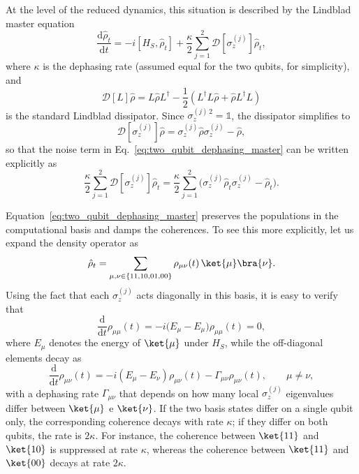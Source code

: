 At the level of the reduced dynamics, this situation is described by the Lindblad master equation
\begin{equation}
	\frac{\mathrm{d}\hat{\rho}_t}{\mathrm{d}t}
	= - i [H_S, \hat{\rho}_t]
	+ \frac{\kappa}{2}\sum_{j=1}^{2} \mathcal{D}[\sigma_z^{(j)}]\hat{\rho}_t,
	\label{eq:two_qubit_dephasing_master}
\end{equation}
where $\kappa$ is the dephasing rate (assumed equal for the two qubits, for simplicity), and
\begin{equation}
	\mathcal{D}[L]\hat{\rho} = L \hat{\rho} L^{\dagger}
	- \frac{1}{2}\left( L^{\dagger} L \hat{\rho} + \hat{\rho} L^{\dagger} L \right)
	\label{eq:dissipator_definition}
\end{equation}
is the standard Lindblad dissipator.  
Since $\sigma_z^{(j)\,2} = \mathbb{1}$, the dissipator simplifies to
\begin{equation}
	\mathcal{D}[\sigma_z^{(j)}]\hat{\rho}
	= \sigma_z^{(j)} \hat{\rho} \sigma_z^{(j)} - \hat{\rho},
\end{equation}
so that the noise term in Eq.~\eqref{eq:two_qubit_dephasing_master} can be written explicitly as
\begin{equation}
	\frac{\kappa}{2}\sum_{j=1}^{2}
	\mathcal{D}[\sigma_z^{(j)}]\hat{\rho}_t
	=
	\frac{\kappa}{2}\sum_{j=1}^{2} 
	\bigl(
	\sigma_z^{(j)} \hat{\rho}_t \sigma_z^{(j)} - \hat{\rho}_t
	\bigr).
	\label{eq:two_qubit_dephasing_dissipator_simple}
\end{equation}

Equation~\eqref{eq:two_qubit_dephasing_master} preserves the populations in the computational basis and damps the coherences.  
To see this more explicitly, let us expand the density operator as
\begin{equation}
	\hat{\rho}_t = \sum_{\mu,\nu \in \{11,10,01,00\}} 
	\rho_{\mu\nu}(t)\, \ket{\mu}\bra{\nu}.
\end{equation}
Using the fact that each $\sigma_z^{(j)}$ acts diagonally in this basis, it is easy to verify that
\begin{equation}
	\frac{\mathrm{d}}{\mathrm{d}t} \rho_{\mu\mu}(t)
	= - i \bigl( E_{\mu} - E_{\mu} \bigr) \rho_{\mu\mu}(t) = 0,
\end{equation}
where $E_{\mu}$ denotes the energy of $\ket{\mu}$ under $H_S$, while the off-diagonal elements decay as
\begin{equation}
	\frac{\mathrm{d}}{\mathrm{d}t} \rho_{\mu\nu}(t)
	= - i (E_{\mu} - E_{\nu}) \rho_{\mu\nu}(t)
	- \Gamma_{\mu\nu} \rho_{\mu\nu}(t),
	\qquad \mu \neq \nu,
\end{equation}
with a dephasing rate $\Gamma_{\mu\nu}$ that depends on how many local $\sigma_z^{(j)}$ eigenvalues differ between $\ket{\mu}$ e $\ket{\nu}$.  
If the two basis states differ on a single qubit only, the corresponding coherence decays with rate $\kappa$; if they differ on both qubits, the rate is $2\kappa$.  
For instance, the coherence between $\ket{11}$ and $\ket{10}$ is suppressed at rate $\kappa$, whereas the coherence between $\ket{11}$ and $\ket{00}$ decays at rate $2\kappa$.

